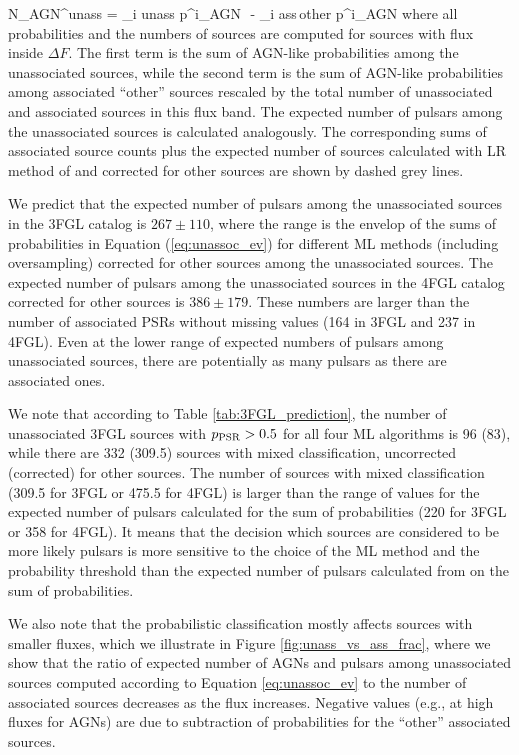 \be
{}
N_{\rm AGN}^{\rm unass} = \sum_{i \in \rm unass} p^i_{\rm AGN}\,\, - \sum_{i \in \rm ass\,other} p^i_{\rm AGN} \cdot 
{}
\ee
where all probabilities and the numbers of sources are computed for sources with flux inside $\Delta F$.
The first term is the sum of AGN-like probabilities among the unassociated sources,
while the second term is the sum of AGN-like probabilities among associated ``other'' sources rescaled by the total number
of unassociated and associated sources in this flux band.
The expected number of pulsars among the unassociated sources is calculated analogously.
The corresponding sums of associated source counts plus the expected number of sources calculated with LR method of \cite{2016ApJ...820....8S} and corrected for other sources are shown by dashed grey lines.


We predict that the expected number of pulsars among the unassociated sources in the 3FGL catalog
is $267 \pm 110$, where the range is the envelop of the sums of probabilities in Equation (\ref{eq:unassoc_ev})
for different ML methods (including oversampling) corrected for other sources among the unassociated sources.
The expected number of pulsars among the unassociated sources in the 4FGL catalog corrected for other sources is 
$386 \pm 179$.
These numbers are larger than the number of associated PSRs without missing values (164 in 3FGL and 237 in 4FGL).
Even at the lower range of expected numbers of pulsars among unassociated sources, there are potentially as many pulsars
as there are associated ones.

We note that according to Table \ref{tab:3FGL_prediction}, the number of unassociated 3FGL sources 
with $p_{\rm PSR} > 0.5$ for all four ML algorithms is 96 (83), while there are 332 (309.5) sources with mixed classification,
uncorrected (corrected) for other sources.
The number of sources with mixed classification (309.5 for 3FGL or 475.5 for 4FGL)
is larger than the range of values for the expected number of pulsars calculated for the sum of probabilities 
(220 for 3FGL or 358 for 4FGL).
It means that the decision which sources are considered to be more likely pulsars is more sensitive to the choice of the ML method
and the probability threshold than the expected number of pulsars calculated from on the sum of probabilities.

We also note that the probabilistic classification mostly affects sources with smaller fluxes,
which we illustrate in Figure \ref{fig:unass_vs_ass_frac}, where we show that the ratio of expected number of AGNs and pulsars among unassociated sources computed according to Equation \ref{eq:unassoc_ev} to the number of associated sources decreases as the flux increases.
Negative values (e.g., at high fluxes for AGNs) are due to subtraction of probabilities for the ``other'' associated sources.

